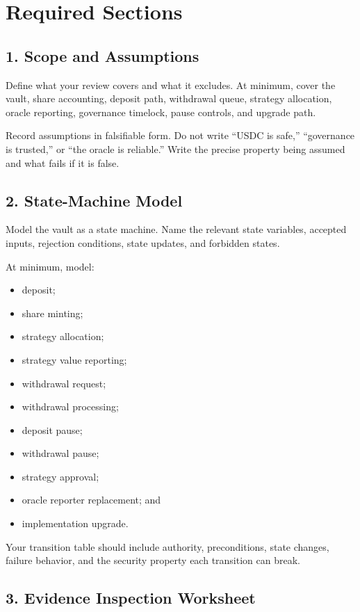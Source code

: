 \section*{Required Sections}

\subsection*{1. Scope and Assumptions}

Define what your review covers and what it excludes. At minimum, cover the vault, share accounting, deposit path, withdrawal queue, strategy allocation, oracle reporting, governance timelock, pause controls, and upgrade path.

Record assumptions in falsifiable form. Do not write ``USDC is safe,'' ``governance is trusted,'' or ``the oracle is reliable.'' Write the precise property being assumed and what fails if it is false.

\subsection*{2. State-Machine Model}

Model the vault as a state machine. Name the relevant state variables, accepted inputs, rejection conditions, state updates, and forbidden states.

At minimum, model:

\begin{itemize}
\item deposit;
\item share minting;
\item strategy allocation;
\item strategy value reporting;
\item withdrawal request;
\item withdrawal processing;
\item deposit pause;
\item withdrawal pause;
\item strategy approval;
\item oracle reporter replacement; and
\item implementation upgrade.
\end{itemize}

Your transition table should include authority, preconditions, state changes, failure behavior, and the security property each transition can break.

\subsection*{3. Evidence Inspection Worksheet}

